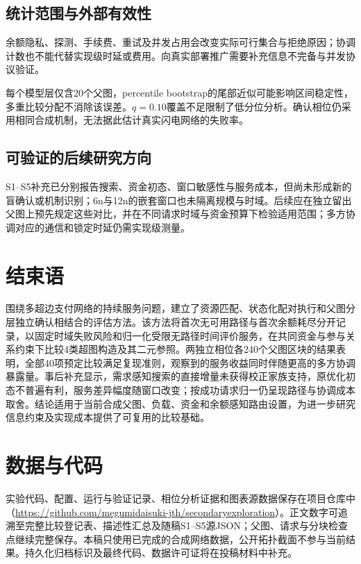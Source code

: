 \documentclass[UTF8,a4paper,twocolumn,fontset=none,zihao=5]{ctexart}
\begin{document}
\subsection{统计范围与外部有效性}

余额隐私、探测、手续费、重试及并发占用会改变实际可行集合与拒绝原因；协调计数也不能代替实现级时延或费用。向真实部署推广需要补充信息不完备与并发协议验证。


每个模型层仅含20个父图，percentile bootstrap的尾部近似可能影响区间稳定性，多重比较分配不消除该误差。$q=0.10$覆盖不足限制了低分位分析。确认相位仍采用相同合成机制，无法据此估计真实闪电网络的失败率。


\subsection{可验证的后续研究方向}

S1–S5补充已分别报告搜索、资金初态、窗口敏感性与服务成本，但尚未形成新的盲确认或机制识别；6n与12n的嵌套窗口也未隔离规模与时域。后续应在独立留出父图上预先规定这些对比，并在不同请求时域与资金预算下检验适用范围；多方协调对应的通信和锁定时延仍需实现级测量。


\section{结束语}

围绕多超边支付网络的持续服务问题，建立了资源匹配、状态化配对执行和父图分层独立确认相结合的评估方法。该方法将首次无可用路径与首次余额耗尽分开记录，以固定时域失败风险和归一化受限无路径时间评价服务，在共同资金与参与关系约束下比较4类超图构造及其二元参照。两独立相位各240个父图区块的结果表明，全部40项预定比较满足复现准则，观察到的服务收益同时伴随更高的多方协调暴露量。事后补充显示，需求感知搜索的直接增量未获得校正家族支持，原优化初态不普遍有利，服务差异幅度随窗口改变；按成功请求归一仍呈现路径与协调成本取舍。结论适用于当前合成父图、负载、资金和余额感知路由设置，为进一步研究信息约束及实现成本提供了可复用的比较基础。


\section*{数据与代码}

实验代码、配置、运行与验证记录、相位分析证据和图表源数据保存在项目仓库中（\url{https://github.com/megumidaisuki-jth/secondaryexploration}）。正文数字可追溯至完整比较登记表、描述性汇总及随稿S1–S5源JSON；父图、请求与分块检查点继续完整保存。本稿只使用已完成的合成网络数据，公开拓扑截面不参与当前结果。持久化归档标识及最终代码、数据许可证将在投稿材料中补充。
\end{document}
